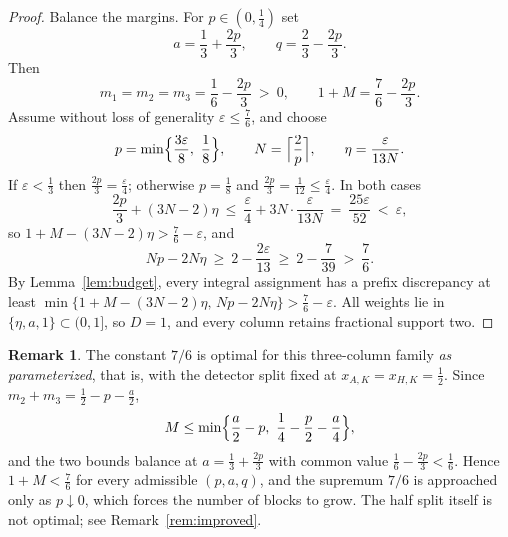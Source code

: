 \documentclass[11pt]{article}
\theoremstyle{definition}
\newtheorem{remark}[theorem]{Remark}
\newcommand{\eps}{\varepsilon}
\begin{document}
\begin{proof}
Balance the margins.  For $p\in(0,\tfrac14)$ set
\[
 a=\frac13+\frac{2p}3,
 \qquad
 q=\frac23-\frac{2p}3 .
\]
Then
\[
 m_1=m_2=m_3=\frac16-\frac{2p}3\ >\ 0,
 \qquad
 1+M=\frac76-\frac{2p}3 .
\]
Assume without loss of generality $\eps\le\tfrac76$, and choose
\[
 p=\min\Bigl\{\frac{3\eps}8,\ \frac18\Bigr\},
 \qquad
 N=\Bigl\lceil\frac2p\Bigr\rceil,
 \qquad
 \eta=\frac{\eps}{13N}.
\]
If $\eps<\tfrac13$ then $\frac{2p}3=\frac\eps4$; otherwise $p=\tfrac18$ and
$\frac{2p}3=\frac1{12}\le\frac\eps4$.  In both cases
\[
 \frac{2p}3+(3N-2)\eta
 \ \le\
 \frac{\eps}4+3N\cdot\frac{\eps}{13N}
 \ =\
 \frac{25\eps}{52}
 \ <\ \eps,
\]
so $1+M-(3N-2)\eta>\frac76-\eps$, and
\[
 Np-2N\eta\ \ge\ 2-\frac{2\eps}{13}\ \ge\ 2-\frac7{39}\ >\ \frac76 .
\]
By Lemma~\ref{lem:budget}, every integral assignment has a prefix
discrepancy at least
$\min\{1+M-(3N-2)\eta,\,Np-2N\eta\}>\frac76-\eps$.
All weights lie in $\{\eta,a,1\}\subset(0,1]$, so $D=1$, and every column
retains fractional support two.
\end{proof}

\begin{remark}\label{rem:optimal}
The constant $7/6$ is optimal for this three-column family \emph{as
parameterized}, that is, with the detector split fixed at
$x_{A,K}=x_{H,K}=\frac12$.  Since $m_2+m_3=\frac12-p-\frac a2$,
\[
 M\le\min\Bigl\{\frac a2-p,\ \frac14-\frac p2-\frac a4\Bigr\},
\]
and the two bounds balance at $a=\frac13+\frac{2p}3$ with common value
$\frac16-\frac{2p}3<\frac16$.  Hence $1+M<\frac76$ for every admissible
$(p,a,q)$, and the supremum $7/6$ is approached only as $p\downarrow0$,
which forces the number of blocks to grow.  The half split itself is not
optimal; see Remark~\ref{rem:improved}.
\end{remark}
\end{document}
